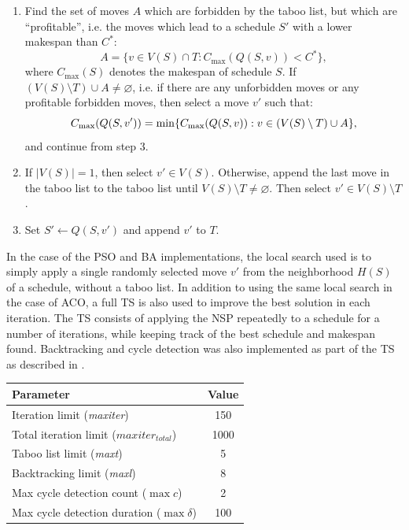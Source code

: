\documentclass[paper=a4, fontsize=9pt]{scrartcl}
\begin{document}
\begin{multicols}{2}
\begin{enumerate}
    \item Find the set of moves $A$ which are forbidden by the taboo list, but which are ``profitable'', i.e. the moves which lead to a schedule $S'$ with a lower makespan than $C^*$:
    \begin{equation}
        A = \{v \in V(S) \cap T : C_{\max}(Q(S, v)) < C^*\},
    \end{equation}
    where $C_{\max}(S)$ denotes the makespan of schedule $S$. If $(V(S) \setminus T) \cup A \ne \varnothing$, i.e. if there are any unforbidden moves or any profitable forbidden moves, then select a move $v'$ such that:
    \begin{equation}
        \small
        C_{\max}(Q(S, v')) = \min \{ C_{\max}(Q(S, v)) : v \in (V(S)\setminus T) \cup A \},
    \end{equation}
    and continue from step 3.
    \item If $|V(S)|=1$, then select $v' \in V(S)$. Otherwise, append the last move in the taboo list to the taboo list until ${ V(S)\setminus T \ne \varnothing }$. Then select ${v' \in V(S)\setminus T}$.
    \item Set $S' \gets Q(S, v')$ and append $v'$ to $T$.
\end{enumerate}

In the case of the \ac{PSO} and \ac{BA} implementations, the local search used is to simply apply a single randomly selected move $v'$ from the neighborhood $H(S)$ of a schedule, without a taboo list. In addition to using the same local search in the case of \ac{ACO}, a full \ac{TS} is also used to improve the best solution in each iteration. The \acl{TS} consists of applying the \acl{NSP} repeatedly to a schedule for a number of iterations, while keeping track of the best schedule and makespan found. Backtracking and cycle detection was also implemented as part of the \ac{TS} as described in \cite{nowicki1996fast}.

{
\vspace{0.5cm}
\begin{minipage}{\linewidth{}}
\centering
\begin{tabular}{lc}
\toprule
Parameter                                                 & Value \\
\midrule
Iteration limit (\textit{maxiter})                        &   150 \\
Total iteration limit ($\textit{maxiter}_\textit{total}$) &  1000 \\
Taboo list limit (\textit{maxt})                          &     5 \\
Backtracking limit (\textit{maxl})                        &     8 \\
Max cycle detection count ($\max c$)                      &     2 \\
Max cycle detection duration ($\max \delta$)              &   100 \\
\bottomrule
\end{tabular}
\vspace{-0.2cm}
\label{table:tsparams}
\end{minipage}
}


\end{multicols}
\end{document}
